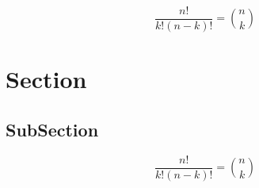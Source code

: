 \documentclass[a4paper]{article}
\begin{document}
\[ \frac{n!}{k!(n-k)!} = \binom{n}{k} \]

\section{Section}

\subsection{SubSection}

\[ \frac{n!}{k!(n-k)!} = \binom{n}{k} \]
\end{document}
